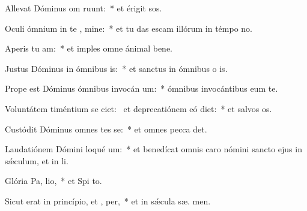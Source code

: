 \item Allevat Dóminus om  ruunt:~* et érigit  sos.
\item Oculi ómnium in te , mine:~* et tu das escam illórum in témpo no.
\item Aperis tu  am:~* et imples omne ánimal bene.
\item Justus Dóminus in ómnibus  is:~* et sanctus in ómnibus o is.
\item Prope est Dóminus ómnibus invocán um:~* ómnibus invocántibus eum  te.
\item Voluntátem timéntium se ciet:~\pscross{} et deprecatiónem eó diet:~* et salvos  os.
\item Custódit Dóminus omnes tes se:~* et omnes pecca det.
\item Laudatiónem Dómini loqué  um:~* et benedícat omnis caro nómini sancto ejus in sǽculum, et in  li.
\item Glória Pa,  lio,~* et Spi to.
\item Sicut erat in princípio, et ,  per,~* et in sǽcula sæ. men.
